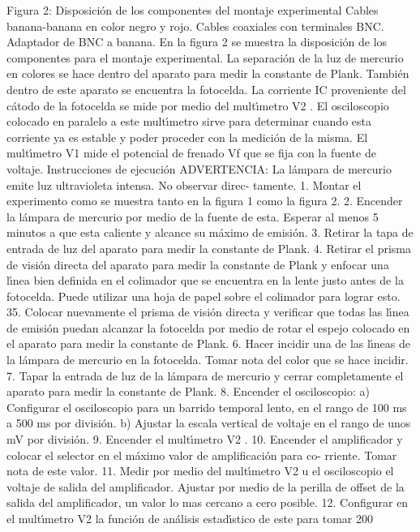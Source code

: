 \documentclass[twocolumn,a4paper,11pt]{scrartcl}
\begin{document}
Figura 2: Disposición de los componentes del montaje experimental
Cables banana-banana en color negro y rojo.
Cables coaxiales con terminales BNC.
Adaptador de BNC a banana.
En la figura 2 se muestra la disposición de los componentes para el montaje experimental. La
separación de la luz de mercurio en colores se hace dentro del aparato para medir la constante de
Plank. También dentro de este aparato se encuentra la fotocelda.
La corriente IC proveniente del cátodo de la fotocelda se mide por medio del multı́metro V2 . El
osciloscopio colocado en paralelo a este multı́metro sirve para determinar cuando esta corriente ya
es estable y poder proceder con la medición de la misma.
El multı́metro V1 mide el potencial de frenado Vf que se fija con la fuente de voltaje.
Instrucciones de ejecución
ADVERTENCIA: La lámpara de mercurio emite luz ultravioleta intensa. No observar direc-
tamente.
1. Montar el experimento como se muestra tanto en la figura 1 como la figura 2.
2. Encender la lámpara de mercurio por medio de la fuente de esta. Esperar al menos 5 minutos
a que esta caliente y alcance su máximo de emisión.
3. Retirar la tapa de entrada de luz del aparato para medir la constante de Plank.
4. Retirar el prisma de visión directa del aparato para medir la constante de Plank y enfocar
una lı́nea bien definida en el colimador que se encuentra en la lente justo antes de la fotocelda.
Puede utilizar una hoja de papel sobre el colimador para lograr esto.
35. Colocar nuevamente el prisma de visión directa y verificar que todas las lı́nea de emisión
puedan alcanzar la fotocelda por medio de rotar el espejo colocado en el aparato para medir
la constante de Plank.
6. Hacer incidir una de las lı́neas de la lámpara de mercurio en la fotocelda. Tomar nota del
color que se hace incidir.
7. Tapar la entrada de luz de la lámpara de mercurio y cerrar completamente el aparato para
medir la constante de Plank.
8. Encender el osciloscopio:
a) Configurar el osciloscopio para un barrido temporal lento, en el rango de 100 ms a 500
ms por división.
b) Ajustar la escala vertical de voltaje en el rango de unos mV por división.
9. Encender el multı́metro V2 .
10. Encender el amplificador y colocar el selector en el máximo valor de amplificación para co-
rriente. Tomar nota de este valor.
11. Medir por medio del multı́metro V2 u el osciloscopio el voltaje de salida del amplificador.
Ajustar por medio de la perilla de offset de la salida del amplificador, un valor lo mas cercano
a cero posible.
12. Configurar en el multı́metro V2 la función de análisis estadı́stico de este para tomar 200
\end{document}
